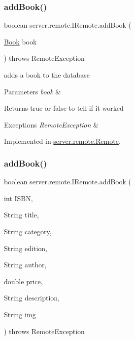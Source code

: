\subsubsection{\texorpdfstring{add\+Book()}{addBook()}\hspace{0.1cm}{\footnotesize\ttfamily [1/2]}}
{\footnotesize\ttfamily boolean server.\+remote.\+I\+Remote.\+add\+Book (\begin{DoxyParamCaption}\item[{\hyperlink{classserver_1_1data_1_1_book}{Book}}]{book }\end{DoxyParamCaption}) throws Remote\+Exception}

adds a book to the database 
\begin{DoxyParams}{Parameters}
{\em book} & \\
\hline
\end{DoxyParams}
\begin{DoxyReturn}{Returns}
true or false to tell if it worked 
\end{DoxyReturn}

\begin{DoxyExceptions}{Exceptions}
{\em Remote\+Exception} & \\
\hline
\end{DoxyExceptions}


Implemented in \hyperlink{classserver_1_1remote_1_1_remote_a496fcecd259c1b527ffba62fc452afee}{server.\+remote.\+Remote}.

\mbox{\label{interfaceserver_1_1remote_1_1_i_remote_aec137a7435ccced1aa7350b2fd2a1947}} 
\subsubsection{\texorpdfstring{add\+Book()}{addBook()}\hspace{0.1cm}{\footnotesize\ttfamily [2/2]}}
{\footnotesize\ttfamily boolean server.\+remote.\+I\+Remote.\+add\+Book (\begin{DoxyParamCaption}\item[{int}]{I\+S\+BN,  }\item[{String}]{title,  }\item[{String}]{category,  }\item[{String}]{edition,  }\item[{String}]{author,  }\item[{double}]{price,  }\item[{String}]{description,  }\item[{String}]{img }\end{DoxyParamCaption}) throws Remote\+Exception}

